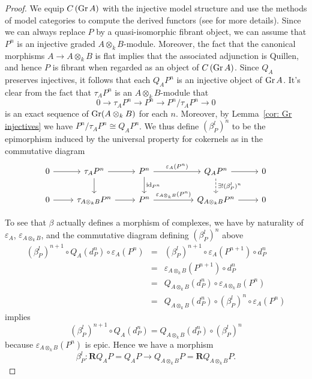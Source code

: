 \begin{proof}
  We equip \(C\left(\operatorname{Gr}A\right)\) with the injective model structure and use the methods of model categories to compute the derived functors (see \textcite{Hovey01} for more details).
  Since we can always replace \(P\) by a quasi-isomorphic fibrant object, we can assume that \(P^n\) is an injective graded \(A \otimes_k B\)-module.
  Moreover, the fact that the canonical morphisms \(A \to A \otimes_k B\) is flat implies that the associated adjunction is Quillen, and hence \(P\) is fibrant when regarded as an object of  \(C\left(\operatorname{Gr}A\right)\).
  Since \(Q_A\) preserves injectives, it follows that each \(Q_A P^n\) is an injective object of \(\operatorname{Gr}A\).
  It's clear from the fact that \(\tau_A P^n\) is an \(A \otimes_k B\)-module that   \[0 \to \tau_A P^n \to P^n \to P^n/\tau_A P^n \to 0\]
  is an exact sequence of \(\operatorname{Gr}(A \otimes_k B)\) for each \(n\).
  Moreover, by Lemma~\ref{cor: Gr injectives} we have \(P^n/\tau_A P^n \cong Q_A P^n\).
  We thus define \((\beta^l_P)^n\) to be the epimorphism induced by the universal property for cokernels as in the commutative diagram
  \[\begin{tikzcd}
  0 \arrow{r} & \tau_{A} P^n \arrow{d}\arrow{r} & P^n \arrow{d}{\id_{P^n}}\arrow{rr}{\varepsilon_{A}(P^n)} && Q_{A} P^n \arrow{r}\arrow[dashed]{d}{\exists ! (\beta^l_P)^n} & 0\\
  0 \arrow{r} & \tau_{A \otimes_k B} P^n \arrow{r} & P^n\arrow{rr}{\varepsilon_{A \otimes_k B}(P^n)} && Q_{A \otimes_k B} P^n \arrow{r} & 0 
  \end{tikzcd}\]

  To see that \(\beta\) actually defines a morphism of complexes, we have by naturality of \(\varepsilon_A\), \(\varepsilon_{A \otimes_k B}\), and the commutative diagram defining \((\beta^l_P)^n\) above 
  \begin{eqnarray*}
    (\beta^l_P)^{n+1} \circ Q_{A}(d^n_{P}) \circ \varepsilon_{A}(P^n)
    &=& (\beta^l_P)^{n+1} \circ \varepsilon_{A}(P^{n+1}) \circ d^n_{P}\\
    &=& \varepsilon_{A \otimes_k B}(P^{n+1}) \circ d^n_{P}\\
    &=& Q_{A \otimes_k B}(d_{P}^n) \circ \varepsilon_{A \otimes_k B}(P^n)\\
    &=& Q_{A \otimes_k B}(d_{P}^n) \circ (\beta^l_P)^n \circ \varepsilon_{A}(P^n)
  \end{eqnarray*}
  implies
  \[(\beta^l_P)^{n+1} \circ Q_{A}(d^n_{P}) = Q_{A \otimes_k B}(d^n_{P}) \circ (\beta^l_P)^n\]
  because \(\varepsilon_{A \otimes_k B}(P^n)\) is epic. Hence we have a morphism
  \[\beta^l_P \colon \mathbf{R}Q_{A} P = Q_{A} P \to Q_{A \otimes_k B} P = \mathbf{R}Q_{A \otimes_k B} P.\]


\end{proof}
